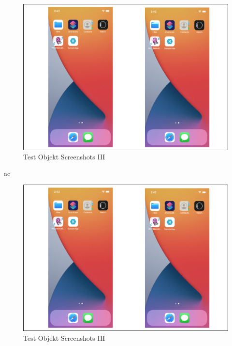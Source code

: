 \begin{figure}[!ht]
 \includegraphics[width=\textwidth,keepaspectratio]{Images/Screenshot/AppIconAndMenu.png}
 \caption{Test Objekt Screenshots III}
 \label{fig:TestObjectI}
\end{figure}ac

\begin{figure}[!ht]
 \includegraphics[width=\textwidth,keepaspectratio]{Images/Screenshot/AppIconAndMenu.png}
 \caption{Test Objekt Screenshots III}
 \label{fig:TestObjectI}
\end{figure}


